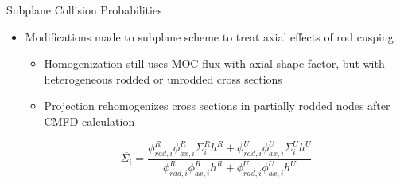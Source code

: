 \begin{frame}[t]{Subplane Collision Probabilities}
    
    \begin{itemize}
        \item Modifications made to subplane scheme \cite{Graham2017Improvementofthe2D/1DMethodUsingtheSub-PlaneScheme,Graham2017RodDecuspingTechniquesforthe2D/1DMethod} to treat axial effects of rod cusping
        \begin{itemize}
            \item Homogenization still uses MOC flux with axial shape factor, but 
            with heterogeneous rodded or unrodded cross sections
            \item Projection rehomogenizes cross sections in partially rodded nodes 
            after CMFD calculation
        \end{itemize}
        \begin{equation}\label{e:nTRACERdecusping}
        \overline{\Sigma_i} = \frac{\phi_{rad,i}^R \phi_{ax,i}^R \Sigma_i^R h^R + \phi_{rad,i}^U \phi_{ax,i}^U \Sigma_i^U h^U}{\phi_{rad,i}^R \phi_{ax,i}^R h^R + \phi_{rad,i}^U \phi_{ax,i}^U h^U} \nonumber
        \end{equation}
    \end{itemize}
    
\end{frame}


